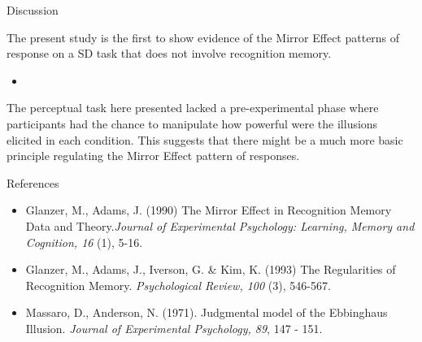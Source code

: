 \documentclass[final]{beamer}
\newlength{\onecolwid}
\begin{document}
\begin{frame}[t]
\begin{columns}[t]
\begin{column}{\onecolwid}
\begin{alertblock}{Discussion}

The present study is the first to show evidence of the Mirror Effect patterns of response on a SD task that does not involve recognition memory. 
\begin{itemize}
\item
\end{itemize}
The perceptual task here presented lacked a pre-experimental phase where participants had the chance to manipulate how powerful were the illusions elicited in each condition. This suggests that there might be a much more basic principle regulating the Mirror Effect pattern of responses.

\end{alertblock}


\begin{alertblock}{References}

\begin{itemize}
\item Glanzer, M., Adams, J. (1990) The Mirror Effect in Recognition Memory \: Data and Theory.\textit{Journal of Experimental Psychology: Learning, Memory and Cognition, 16} (1), 5-16.
\item Glanzer, M., Adams, J., Iverson, G. \& Kim, K. (1993) The Regularities of Recognition Memory. \textit{Psychological Review, 100} (3), 546-567.
\item Massaro, D., Anderson, N. (1971). Judgmental model of the Ebbinghaus Illusion. \textit{Journal of Experimental Psychology, 89}, 147 - 151.
\end{itemize}


\end{alertblock}
\end{column}
\end{columns}
\end{frame}
\end{document}

